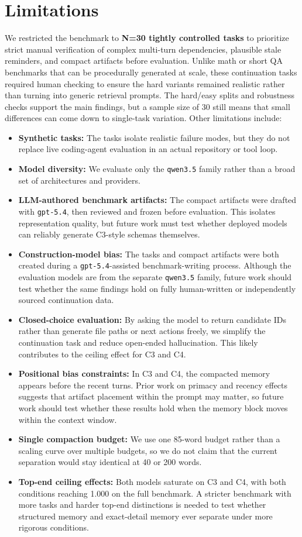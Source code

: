 \documentclass[11pt]{article}
\begin{document}
\section{Limitations}
We restricted the benchmark to \textbf{N=30 tightly controlled tasks} to prioritize strict manual verification of complex multi-turn dependencies, plausible stale reminders, and compact artifacts before evaluation. Unlike math or short QA benchmarks that can be procedurally generated at scale, these continuation tasks required human checking to ensure the hard variants remained realistic rather than turning into generic retrieval prompts. The hard/easy splits and robustness checks support the main findings, but a sample size of 30 still means that small differences can come down to single-task variation. Other limitations include:
\begin{itemize}
    \item \textbf{Synthetic tasks:} The tasks isolate realistic failure modes, but they do not replace live coding-agent evaluation in an actual repository or tool loop.
    \item \textbf{Model diversity:} We evaluate only the \texttt{qwen3.5} family rather than a broad set of architectures and providers.
    \item \textbf{LLM-authored benchmark artifacts:} The compact artifacts were drafted with \texttt{gpt-5.4}, then reviewed and frozen before evaluation. This isolates representation quality, but future work must test whether deployed models can reliably generate C3-style schemas themselves.
    \item \textbf{Construction-model bias:} The tasks and compact artifacts were both created during a \texttt{gpt-5.4}-assisted benchmark-writing process. Although the evaluation models are from the separate \texttt{qwen3.5} family, future work should test whether the same findings hold on fully human-written or independently sourced continuation data.
    \item \textbf{Closed-choice evaluation:} By asking the model to return candidate IDs rather than generate file paths or next actions freely, we simplify the continuation task and reduce open-ended hallucination. This likely contributes to the ceiling effect for C3 and C4.
    \item \textbf{Positional bias constraints:} In C3 and C4, the compacted memory appears before the recent turns. Prior work on primacy and recency effects suggests that artifact placement within the prompt may matter, so future work should test whether these results hold when the memory block moves within the context window.
    \item \textbf{Single compaction budget:} We use one 85-word budget rather than a scaling curve over multiple budgets, so we do not claim that the current separation would stay identical at 40 or 200 words.
    \item \textbf{Top-end ceiling effects:} Both models saturate on C3 and C4, with both conditions reaching 1.000 on the full benchmark. A stricter benchmark with more tasks and harder top-end distinctions is needed to test whether structured memory and exact-detail memory ever separate under more rigorous conditions.
\end{itemize}
\end{document}
